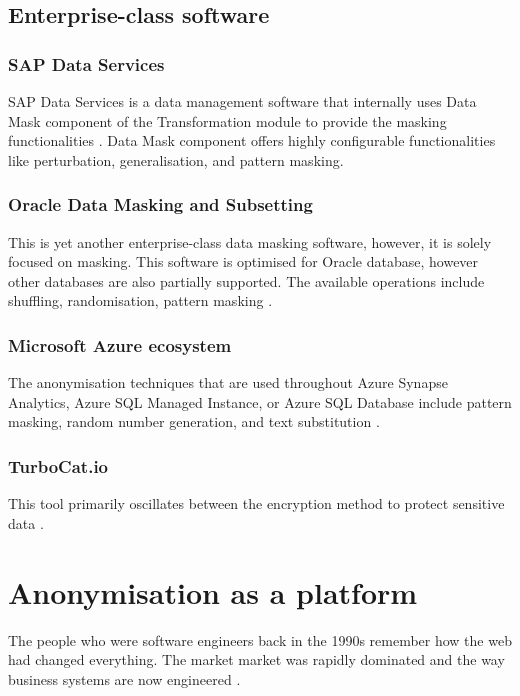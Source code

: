 \documentclass[a4paper,twoside,12pt]{book}
\begin{document}
\subsection{Enterprise-class software}


\subsubsection{SAP Data Services}
SAP Data Services is a data management software that internally uses Data Mask component of the Transformation module to provide the masking functionalities \cite{bib:sap_data_mask}. Data Mask component offers highly configurable functionalities like perturbation, generalisation, and pattern masking.

\subsubsection{Oracle Data Masking and Subsetting}
This is yet another enterprise-class data masking software, however, it is solely focused on masking. This software is optimised for Oracle database, however other databases are also partially supported. The available operations include shuffling, randomisation, pattern masking \cite{bib:oracle_data_mask}.

\subsubsection{Microsoft Azure ecosystem}
The anonymisation techniques that are used throughout Azure Synapse Analytics, Azure SQL Managed Instance, or Azure SQL Database include pattern masking, random number generation, and text substitution \cite{bib:azure_data_mask}.

\subsubsection{TurboCat.io}
This tool primarily oscillates between the encryption method to protect sensitive data \cite{bib:turbocat}.

\section{Anonymisation as a platform}

The people who were software engineers back in the 1990s remember how the web had changed everything. The market market was rapidly dominated and the way business systems are now engineered \cite{bib:clean_architecture}.
\end{document}

